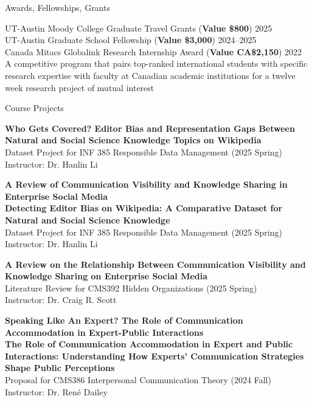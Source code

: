 \documentclass[
	11pt, %
]{resume} %
\begin{document}
\begin{rSection}{Awards, Fellowships, Grants}
	
	UT-Austin Moody College Graduate Travel Grants (\textbf{Value \$800})  \hfill 2025\\
	UT-Austin Graduate School Fellowship   (\textbf{Value \$3,000})  \hfill 2024--2025\\
    Canada Mitacs Globalink Research Internship Award     (\textbf{Value CA\$2,150})  \hfill 2022\\
\textbullet\enspace  A competitive program that pairs top-ranked international students with specific research expertise with faculty at Canadian academic institutions for a twelve week research project of mutual interest\\
	
\end{rSection}


\begin{rSection}{Course Projects}

	\textbf{Who Gets Covered? Editor Bias and Representation Gaps Between Natural and Social Science Knowledge Topics on Wikipedia} \\
    Dataset Project for INF 385 Responsible Data Management (2025 Spring)\\ Instructor: Dr. Hanlin Li 
    
	\textbf{A Review of Communication Visibility and Knowledge Sharing in Enterprise Social Media}\\
	\textbf{Detecting Editor Bias on Wikipedia: A Comparative Dataset for Natural and Social Science Knowledge} \\
    Dataset Project for INF 385 Responsible Data Management (2025 Spring)\\ Instructor: Dr. Hanlin Li 
    
	\textbf{A Review on the Relationship Between Communication Visibility and Knowledge Sharing on Enterprise Social Media}\\
    Literature Review for CMS392 Hidden Organizations (2025 Spring)\\
    Instructor: Dr. Craig R. Scott 
	

	\textbf{Speaking Like An Expert? The Role of Communication Accommodation in Expert-Public Interactions}\\
	\textbf{The Role of Communication Accommodation in Expert and Public Interactions: Understanding How Experts’ Communication Strategies Shape Public Perceptions}\\
    Proposal for CMS386 Interpersonal Communication Theory (2024 Fall)\\
    Instructor: Dr. René Dailey\\

	
\end{rSection}
\end{document}
